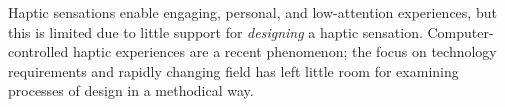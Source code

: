 %
%
%
%
%
%
Haptic sensations enable engaging, personal, and low-attention experiences, but this is limited due to little support for \emph{designing} a haptic sensation.
Computer-controlled haptic experiences are a recent phenomenon; the focus on technology requirements and rapidly changing field has left little room for examining processes of design in a methodical way.

